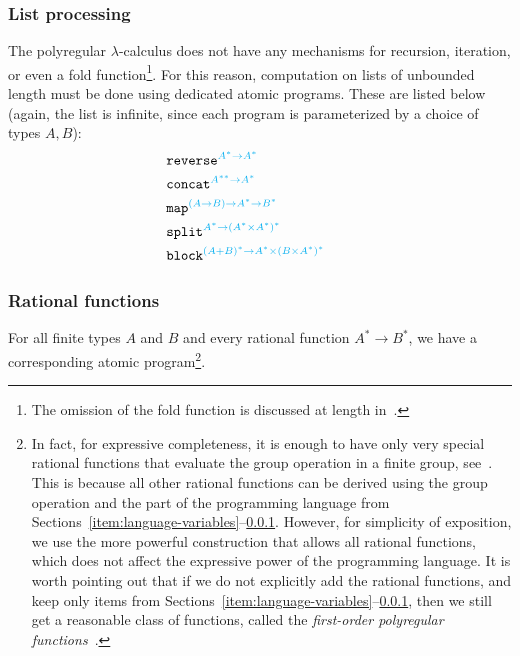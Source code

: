 \documentclass[a4paper,UKenglish,cleveref, autoref, thm-restate]{lipics-v2021}
\begin{document}
  \subsubsection{List processing}  \label{item:language-list-processing} The polyregular $\lambda$-calculus does not have any mechanisms for recursion, iteration, or even a fold function\footnote{The omission of the fold function is discussed at length in~\cite{polyregular-fold}.}. For this reason, computation on lists of unbounded length  must be done using dedicated atomic programs. These are listed below (again, the list is infinite, since each program is parameterized by a choice of types $A,B$):
    \begin{align*}
       & \mathtt{reverse}^{{\color{cyan}A^* \to A^*}} \\
        & \mathtt{concat}^{{\color{cyan}A^{**} \to A^*}} \\
       & \mathtt{map}^{{\color{cyan}(A \to B) \to A^* \to B^*}} \\
       & \mathtt{split}^{{\color{cyan}A^* \to (A^* \times A^*)^*}} \\
        &        \mathtt{block}^{{\color{cyan}(A+B)^* \to A^* \times (B \times A^*)^*}} \qquad 
    \end{align*}
   
    \subsubsection{Rational functions} For all finite types $A$ and $B$ and every rational function $A^* \to B^*$, we have a corresponding atomic program\footnote{In fact, for expressive completeness, it is enough to have only very special rational functions that evaluate the group operation in a finite group, see~\cite[Figure 1]{polyregular-survey}. This is because all other rational functions can be derived using the group operation and the part of the programming language from Sections~\ref{item:language-variables}--\ref{item:language-list-processing}. However, for simplicity of exposition, we use the more powerful construction that allows all rational functions, which does not affect the expressive power of the programming language. It is worth pointing out that if we do not explicitly add the rational functions, and keep only items from Sections~\ref{item:language-variables}--\ref{item:language-list-processing}, then we still get a reasonable class of functions, called the \emph{first-order polyregular functions}~\cite[Theorem 4.4]{bojanczykPolyregularFunctions2018}.}.
\end{document}
